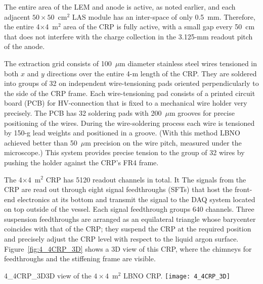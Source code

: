 The entire area of the LEM and anode is active, as noted earlier, and each adjacent
$50\times50$~cm$^2$ LAS module  has an inter-space 
of only 0.5~mm. %
Therefore, %
the entire 4$\times$4~m$^2$ area of the
CRP is fully active, with a small gap every 50~cm that does not interfere with
the charge collection in the 3.125-mm readout pitch of the anode.

The extraction grid consists of 100~$\mu$m diameter stainless steel
wires tensioned in both $x$ and $y$ directions over the entire 4-m
length of the CRP. They are soldered into groups of 32 on independent
wire-tensioning pads %
oriented perpendicularly to the side of the CRP
frame. 
Each wire-tensioning pad consists of a printed circuit board (PCB) for HV-connection that is fixed to a
mechanical wire holder very precisely. The PCB %
has 32 soldering pads with 200~$\mu$m grooves for precise positioning of
the wires. During the wire-soldering process each wire is tensioned by
150-g lead weights and positioned in a groove. 
(With this method LBNO achieved better than 50~$\mu$m precision on the wire pitch, measured under the microscope.)
This system provides precise tension to the
group of 32 wires by pushing the holder against the CRP's FR4 frame. %

The 4$\times$4~m$^2$ CRP has 5120 readout channels
in total. It %
The signals from the CRP are read out
through eight signal feedthroughs (SFTs) that host the front-end
electronics at its bottom and transmit the signal to the DAQ system
located on top outside of the vessel. 
  Each signal feedthrough groups
640 channels. %
Three suspension feedthroughs are arranged as an
equilateral triangle whose barycenter coincides with that of the CRP; they suspend the CRP at the
required position and precisely adjust the CRP level with
respect to the liquid argon surface. Figure~\ref{fig:4_4CRP_3D} shows
a 3D view of this CRP, where the chimneys for
feedthroughs and the %
stiffening frame are visible.
\begin{cdrfigure}{4_4CRP_3D}{3D view of the $4\times4$~m$^2$ LBNO CRP.}
\texttt{[image: 4\_4CRP\_3D]}  
\end{cdrfigure}

